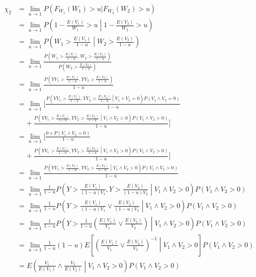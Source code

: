 \documentclass[12pt]{article}
\begin{document}
\begin{align*}
\chi_2 &= \lim_{u\rightarrow 1} P(F_{W_1}(W_1) > u | F_{W_2}(W_2) > u) \\
&= \lim_{u\rightarrow 1} P\left(1-\frac{E(V_1)}{W_1} > u \middle| 1-\frac{E(V_2)}{W_2} > u\right) \\
&= \lim_{u\rightarrow 1} P\left(W_1 > \frac{E(V_1)}{1-u} \middle| W_2 > \frac{E(V_2)}{1-u}\right) \\
&= \lim_{u\rightarrow 1} \frac{P\left(W_1 > \frac{E(V_1)}{1-u}, W_2 > \frac{E(V_2)}{1-u}\right)}{P\left(W_2 > \frac{E(V_2)}{1-u}\right)} \\
&= \lim_{u\rightarrow 1} \frac{P\left(YV_1 > \frac{E(V_1)}{1-u}, YV_2 > \frac{E(V_2)}{1-u}\right)}{1-u} \\
&= \lim_{u\rightarrow 1}\Bigg[ \frac{P\left(YV_1 > \frac{E(V_1)}{1-u}, YV_2 > \frac{E(V_2)}{1-u} \middle| V_1 \wedge V_2 = 0\right)P\left(V_1\wedge V_2 = 0\right)}{1-u} \\
&~~~~~+ \frac{P\left(YV_1 > \frac{E(V_1)}{1-u}, YV_2 > \frac{E(V_2)}{1-u} \middle| V_1 \wedge V_2 > 0\right)P\left(V_1\wedge V_2 > 0\right)}{1-u} \Bigg] \\
&= \lim_{u\rightarrow 1}\Bigg[ \frac{0\times P\left(V_1\wedge V_2 = 0\right)}{1-u} \\
&~~~~~+ \frac{P\left(YV_1 > \frac{E(V_1)}{1-u}, YV_2 > \frac{E(V_2)}{1-u} \middle| V_1 \wedge V_2 > 0\right)P\left(V_1\wedge V_2 > 0\right)}{1-u} \Bigg] \\
&= \lim_{u\rightarrow 1}\frac{P\left(YV_1 > \frac{E(V_1)}{1-u}, YV_2 > \frac{E(V_2)}{1-u} \middle| V_1 \wedge V_2 > 0\right)P\left(V_1\wedge V_2 > 0\right)}{1-u}  \\
&= \lim_{u\rightarrow 1} \frac{1}{1-u}P\left(Y > \frac{E(V_1)}{(1-u)V_1}, Y > \frac{E(V_2)}{(1-u)V_2}\middle| V_1 \wedge V_2 > 0 \right) P\left(V_1 \wedge V_2 > 0 \right) \\
&= \lim_{u\rightarrow 1} \frac{1}{1-u}P\left(Y > \frac{E(V_1)}{(1-u)V_1} \vee \frac{E(V_2)}{(1-u)V_2}\middle| V_1 \wedge V_2 > 0 \right)  P\left(V_1 \wedge V_2 > 0 \right)\\
&= \lim_{u\rightarrow 1} \frac{1}{1-u}P\left(Y > \frac{1}{1-u}\left(\frac{E(V_1)}{V_1} \vee \frac{E(V_2)}{V_2}\right)\middle| V_1 \wedge V_2 > 0 \right)  P\left(V_1 \wedge V_2 > 0 \right)\\
&= \lim_{u\rightarrow 1} \frac{1}{1-u}(1-u) E\left[\left(\frac{E(V_1)}{V_1} \vee \frac{E(V_2)}{V_2}\right)^{-1}\middle| V_1 \wedge V_2 > 0 \right]  P\left(V_1 \wedge V_2 > 0 \right)\\
&= E\left(\frac{V_1}{E(V_1)} \wedge \frac{V_2}{E(V_2)}\middle| V_1 \wedge V_2 > 0 \right)  P\left(V_1 \wedge V_2 > 0 \right)\\
\end{align*}
\end{document}
